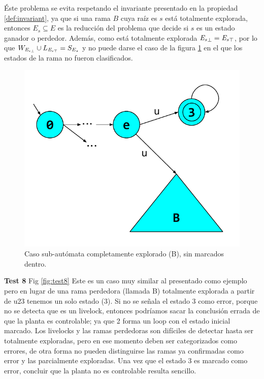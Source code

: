 Éste problema se evita respetando el invariante presentado en la propiedad \ref{def:invariant}, ya que si una rama $B$ cuya raíz es $s$ está totalmente explorada, entonces $E_s \subseteq E$ es la reducción del problema que decide si $s$ es un estado ganador o perdedor. Además, como está totalmente explorada $\mathit{{E_s}_{\bot}} = \mathit{{E_s}_{\top}}$, por lo que $W_{\mathit{{E_s}_{\bot}}} \cup L_{\mathit{{E_s}_{\top}}} = S_{E_{s}}$ y no puede darse el caso de la figura \ref{fig:falenciasErrores} en el que los estados de la rama no fueron clasificados.

\begin{figure}[htb]
	\centering
	\includegraphics[width=\linewidth/2]{figures/FalenciasErrores.pdf}
	\caption{Caso sub-autómata completamente explorado (B), sin marcados dentro.}
	\label{fig:falenciasErrores}
\end{figure}

\FloatBarrier
\textbf{Test 8} Fig \ref{fig:test8} 
Este es un caso muy similar al presentado como ejemplo pero en lugar de una rama perdedora (llamada B) totalmente explorada a partir de u23 tenemos un solo estado (3). Si no se señala el estado 3 como error, porque no se detecta que es un livelock, entonces podríamos sacar la conclusión errada de que la planta es controlable; ya que 2 forma un loop con el estado inicial marcado. Los livelocks y las ramas perdedoras son difíciles de detectar hasta ser totalmente exploradas, pero en ese momento deben ser categorizados como errores, de otra forma no pueden distinguirse las ramas ya confirmadas como error y las parcialmente exploradas. Una vez que el estado 3 es marcado como error, concluir que la planta no es controlable resulta sencillo.

